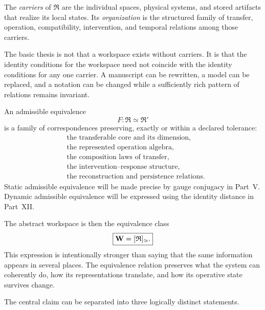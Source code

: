\begin{definition}\label{def:carrier-organization}
The \emph{carriers} of \(\mathfrak R\) are the individual spaces, physical
systems, and stored artifacts that realize its local states. Its
\emph{organization} is the structured family of transfer, operation,
compatibility, intervention, and temporal relations among those carriers.
\end{definition}

The basic thesis is not that a workspace exists without carriers. It is that
the identity conditions for the workspace need not coincide with the identity
conditions for any one carrier. A manuscript can be rewritten, a model can
be replaced, and a notation can be changed while a sufficiently rich pattern
of relations remains invariant.

\begin{definition}\label{def:admissible-equivalence}
An admissible equivalence
\[
F:\mathfrak R\simeq\mathfrak R'
\]
is a family of correspondences preserving, exactly or within a declared
tolerance:
\[
\begin{aligned}
&\text{the transferable core and its dimension},\\
&\text{the represented operation algebra},\\
&\text{the composition laws of transfer},\\
&\text{the intervention--response structure},\\
&\text{the reconstruction and persistence relations}.
\end{aligned}
\]
Static admissible equivalence will be made precise by gauge conjugacy in
Part~V. Dynamic admissible equivalence will be expressed using the identity
distance in Part~XII.
\end{definition}

The abstract workspace is then the equivalence class
\[
\boxed{
\mathbf W=[\mathfrak R]_{\simeq}.
}
\]
This expression is intentionally stronger than saying that the same
information appears in several places. The equivalence relation preserves
what the system can coherently do, how its representations translate, and how
its operative state survives change.


The central claim can be separated into three logically distinct statements.

